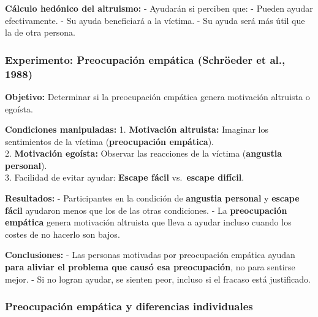 \documentclass[
]{book}
\begin{document}
\textbf{Cálculo hedónico del altruismo:}
- Ayudarán si perciben que:
- Pueden ayudar efectivamente.
- Su ayuda beneficiará a la víctima.
- Su ayuda será más útil que la de otra persona.

\subsubsection{Experimento: Preocupación empática (Schröeder et al., 1988)}\label{experimento-preocupaciuxf3n-empuxe1tica-schruxf6eder-et-al.-1988}

\textbf{Objetivo:} Determinar si la preocupación empática genera motivación altruista o egoísta.

\textbf{Condiciones manipuladas:}
1. \textbf{Motivación altruista:} Imaginar los sentimientos de la víctima (\textbf{preocupación empática}).\\
2. \textbf{Motivación egoísta:} Observar las reacciones de la víctima (\textbf{angustia personal}).\\
3. Facilidad de evitar ayudar: \textbf{Escape fácil} vs.~\textbf{escape difícil}.

\textbf{Resultados:}
- Participantes en la condición de \textbf{angustia personal} y \textbf{escape fácil} ayudaron menos que los de las otras condiciones.
- La \textbf{preocupación empática} genera motivación altruista que lleva a ayudar incluso cuando los costes de no hacerlo son bajos.

\textbf{Conclusiones:}
- Las personas motivadas por preocupación empática ayudan \textbf{para aliviar el problema que causó esa preocupación}, no para sentirse mejor.
- Si no logran ayudar, se sienten peor, incluso si el fracaso está justificado.

\subsubsection{Preocupación empática y diferencias individuales}\label{preocupaciuxf3n-empuxe1tica-y-diferencias-individuales}
\end{document}
